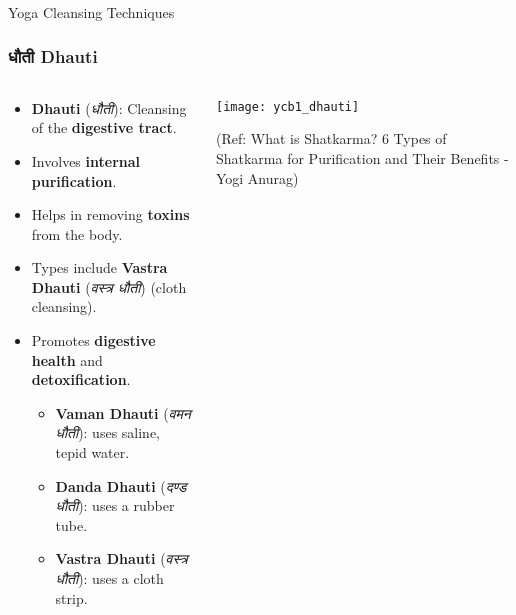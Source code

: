

\begin{frame}[fragile]\frametitle{}
\begin{center}
{\Large Yoga Cleansing Techniques}
\end{center}
\end{frame}

\begin{frame}[fragile]\frametitle{धौती Dhauti}
\begin{columns}
    \begin{column}[T]{0.5\linewidth}
      \begin{itemize}
        \item \textbf{Dhauti} (\textit{धौती}): Cleansing of the \textbf{digestive tract}.
        \item Involves \textbf{internal purification}.
        \item Helps in removing \textbf{toxins} from the body.
        \item Types include \textbf{Vastra Dhauti} (\textit{वस्त्र धौती}) (cloth cleansing).
        \item Promotes \textbf{digestive health} and \textbf{detoxification}.
		\begin{itemize}
		  \item \textbf{Vaman Dhauti} (\textit{वमन धौती}): uses saline, tepid water.
		  \item \textbf{Danda Dhauti} (\textit{दण्ड धौती}): uses a rubber tube.
		  \item \textbf{Vastra Dhauti} (\textit{वस्त्र धौती}): uses a cloth strip.
		\end{itemize}		
      \end{itemize}
    \end{column}
    \begin{column}[T]{0.5\linewidth}
        \begin{center}
        \texttt{[image: ycb1\_dhauti]}
		
		{\tiny (Ref: What is Shatkarma? 6 Types of Shatkarma for Purification and Their Benefits - Yogi Anurag)}	
        \end{center}	
    \end{column}
\end{columns}
\end{frame}


